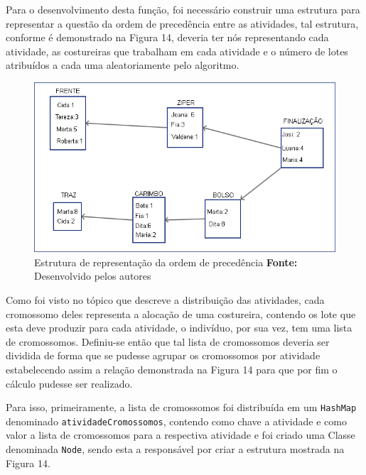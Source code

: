 \par Para o desenvolvimento desta função, foi necessário construir uma estrutura para representar a questão da ordem de precedência entre as atividades, tal estrutura, conforme é demonstrado na Figura 14, deveria ter nós representando cada atividade, as costureiras que 
trabalham em cada atividade e o número de lotes atribuídos a cada uma aleatoriamente pelo algoritmo.

\newpage

\begin{figure}[h!]
	\centerline{\includegraphics[scale=0.6]{./imagens/montagem_node.png}}
	\caption[Distribuição de trabalho]
	{Estrutura de representação da ordem de precedência \textbf{Fonte:} Desenvolvido pelos autores}
	\label{fig:exemplo1}
\end{figure}


\par Como foi visto no tópico que descreve a distribuição das atividades, cada cromossomo deles representa a alocação de uma costureira, contendo os lote que esta deve produzir para cada atividade, o indivíduo, por sua vez, tem uma lista de cromossomos. Definiu-se então
que tal lista de cromossomos deveria ser dividida de forma que se pudesse agrupar os cromossomos por atividade estabelecendo assim a
relação demonstrada na Figura 14 para que por fim o cálculo pudesse ser realizado.

\par Para isso, primeiramente, a lista de cromossomos foi distribuída em um \texttt{HashMap} denominado \texttt{atividadeCromossomos}, contendo como chave a atividade e como valor a lista de cromossomos para a respectiva atividade e foi criado uma Classe denominada \texttt{Node}, sendo esta a responsável por criar a estrutura mostrada na Figura 14.

